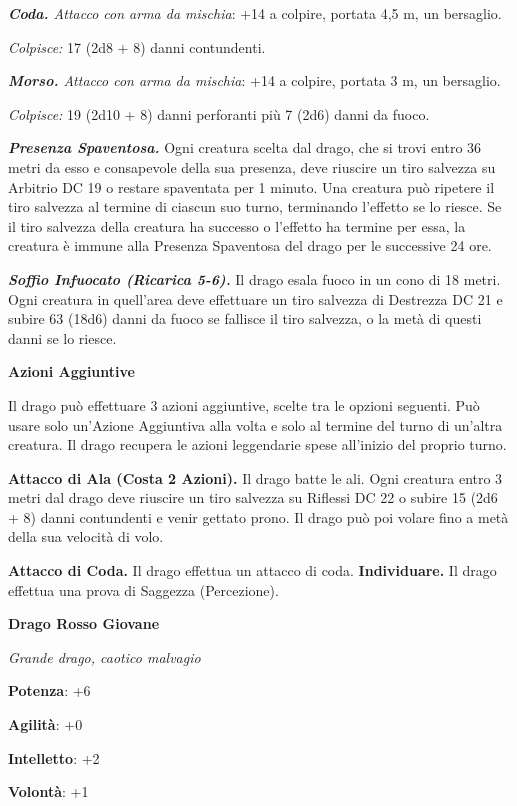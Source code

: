 \begin{multicols}{2}
\emph{\textbf{Coda.} Attacco con arma da mischia}: +14 a colpire,
portata 4,5 m, un bersaglio.

\emph{Colpisce:} 17 (2d8 + 8) danni contundenti.

\emph{\textbf{Morso.} Attacco con arma da mischia}: +14 a colpire,
portata 3 m, un bersaglio.

\emph{Colpisce:} 19 (2d10 + 8) danni perforanti più 7 (2d6) danni da
fuoco.

\emph{\textbf{Presenza Spaventosa.}} Ogni creatura scelta dal drago, che
si trovi entro 36 metri da esso e consapevole della sua presenza, deve
riuscire un tiro salvezza su Arbitrio DC 19 o restare spaventata per 1
minuto. Una creatura può ripetere il tiro salvezza al termine di ciascun
suo turno, terminando l'effetto se lo riesce. Se il tiro salvezza della
creatura ha successo o l'effetto ha termine per essa, la creatura è
immune alla Presenza Spaventosa del drago per le successive 24 ore.

\emph{\textbf{Soffio Infuocato (Ricarica 5-6).}} Il drago esala fuoco in
un cono di 18 metri. Ogni creatura in quell'area deve effettuare un tiro
salvezza di Destrezza DC 21 e subire 63 (18d6) danni da fuoco se
fallisce il tiro salvezza, o la metà di questi danni se lo riesce.

\textbf{Azioni Aggiuntive}

Il drago può effettuare 3 azioni aggiuntive, scelte tra le opzioni
seguenti. Può usare solo un'Azione Aggiuntiva alla volta e solo al
termine del turno di un'altra creatura. Il drago recupera le azioni
leggendarie spese all'inizio del proprio turno.

\textbf{Attacco di Ala (Costa 2 Azioni).} Il drago batte le ali. Ogni
creatura entro 3 metri dal drago deve riuscire un tiro salvezza su Riflessi DC 22 o subire 15 (2d6 + 8) danni contundenti e venir gettato
prono. Il drago può poi volare fino a metà della sua velocità di volo.

\textbf{Attacco di Coda.} Il drago effettua un attacco di coda.
\textbf{Individuare.} Il drago effettua una prova di Saggezza
(Percezione).



\textbf{Drago Rosso Giovane}

\emph{Grande drago, caotico malvagio}

\textbf{Potenza}: +6

\textbf{Agilità}: +0

\textbf{Intelletto}: +2

\textbf{Volontà}: +1


\end{multicols}

